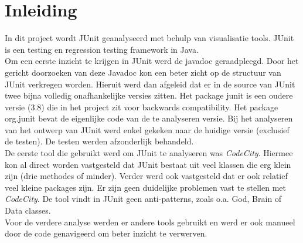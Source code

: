 \documentclass[i1]{oss}
\begin{document}

\maketitlepage
\newpage
\tableofcontents
\pagebreak

\section*{Inleiding}


In dit project wordt JUnit geanalyseerd met behulp van visualisatie tools. JUnit is een testing en regression testing framework in Java.\\


Om een eerste inzicht te krijgen in JUnit werd de javadoc geraadpleegd. Door het gericht doorzoeken van deze Javadoc kon een beter zicht op de structuur van JUnit verkregen worden. Hieruit werd dan afgeleid dat er in de source van JUnit twee bijna volledig onafhankelijke versies zitten. Het package junit is een oudere versie (3.8) die in het project zit voor backwards compatibility. Het package org.junit bevat de eigenlijke code van de te analyseren versie. Bij het analyseren van het ontwerp van JUnit werd enkel gekeken naar de huidige versie (exclusief de testen). De testen werden afzonderlijk behandeld.\\

De eerste tool die gebruikt werd om JUnit te analyseren was \emph{CodeCity}. Hiermee kon al direct worden vastgesteld dat JUnit bestaat uit veel klassen die erg klein zijn (drie methodes of minder). Verder werd ook vastgesteld dat er ook relatief veel kleine packages zijn. Er zijn geen duidelijke problemen vast te stellen met \emph{CodeCity}. De tool vindt in JUnit geen anti-patterns, zoals o.a. God, Brain of Data classes. \\

Voor de verdere analyse werden er andere tools gebruikt en werd er ook manueel door de code genavigeerd om beter inzicht te verwerven. \\
\end{document}
